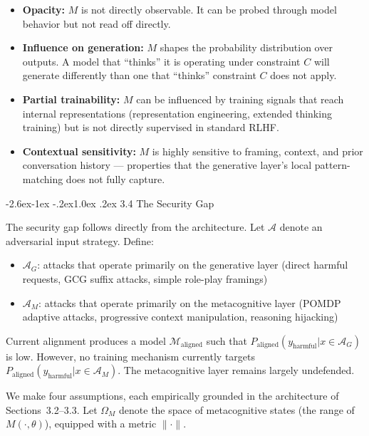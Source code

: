 \documentclass[
  11pt,
]{article}
\makeatletter
\providecommand{\tightlist}{%
  \setlength{\itemsep}{0pt}\setlength{\parskip}{0pt}}
\renewcommand\subsection{\@startsection{subsection}{2}{\z@}%
  {-2.6ex\@plus -1ex \@minus -.2ex}{1.0ex \@plus .2ex}%
  {\normalfont\sffamily\large\bfseries}}
\makeatother
\begin{document}
\begin{itemize}
\tightlist
\item
  \textbf{Opacity:} \(M\) is not directly observable. It can be probed
  through model behavior but not read off directly.
\item
  \textbf{Influence on generation:} \(M\) shapes the probability
  distribution over outputs. A model that ``thinks'' it is operating
  under constraint \(C\) will generate differently than one that
  ``thinks'' constraint \(C\) does not apply.
\item
  \textbf{Partial trainability:} \(M\) can be influenced by training
  signals that reach internal representations (representation
  engineering, extended thinking training) but is not directly
  supervised in standard RLHF.
\item
  \textbf{Contextual sensitivity:} \(M\) is highly sensitive to framing,
  context, and prior conversation history --- properties that the
  generative layer's local pattern-matching does not fully capture.
\end{itemize}

\subsection{3.4 The Security Gap}\label{the-security-gap}

The security gap follows directly from the architecture. Let
\(\mathcal{A}\) denote an adversarial input strategy. Define:

\begin{itemize}
\tightlist
\item
  \(\mathcal{A}_G\): attacks that operate primarily on the generative
  layer (direct harmful requests, GCG suffix attacks, simple role-play
  framings)
\item
  \(\mathcal{A}_M\): attacks that operate primarily on the metacognitive
  layer (POMDP adaptive attacks, progressive context manipulation,
  reasoning hijacking)
\end{itemize}

Current alignment produces a model \(\mathcal{M}_{\text{aligned}}\) such
that \(P_{\text{aligned}}(y_{\text{harmful}} | x \in \mathcal{A}_G)\) is
low. However, no training mechanism currently targets
\(P_{\text{aligned}}(y_{\text{harmful}} | x \in \mathcal{A}_M)\). The
metacognitive layer remains largely undefended.

We make four assumptions, each empirically grounded in the architecture
of Sections~3.2--3.3. Let \(\Omega_M\) denote the space of metacognitive
states (the range of \(M(\cdot,\theta)\)), equipped with a metric
\(\lVert\cdot\rVert\).
\end{document}

